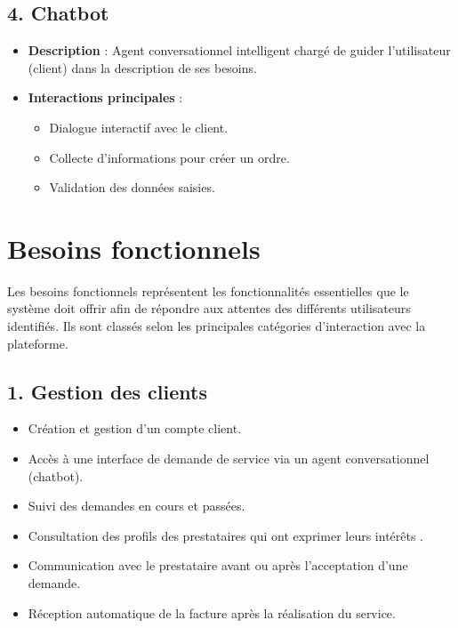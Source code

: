 \subsection*{4. Chatbot}
\begin{itemize}
  \item \textbf{Description} : Agent conversationnel intelligent chargé de guider l’utilisateur (client) dans la description de ses besoins.
  \item \textbf{Interactions principales} :
    \begin{itemize}
        \item Dialogue interactif avec le client.
        \item Collecte d’informations pour créer un ordre.
        \item Validation des données saisies.
    \end{itemize}
\end{itemize}
\section{Besoins fonctionnels}

Les besoins fonctionnels représentent les fonctionnalités essentielles que le système doit offrir afin de répondre aux attentes des différents utilisateurs identifiés. Ils sont classés selon les principales catégories d’interaction avec la plateforme.

\subsection*{1. Gestion des clients}
\begin{itemize}
    \item Création et gestion d’un compte client.
    \item Accès à une interface de demande de service via un agent conversationnel (chatbot).
    \item Suivi des demandes en cours et passées.
    \item Consultation des profils des prestataires qui ont exprimer leurs intérêts .
    \item Communication avec le prestataire avant ou après l’acceptation d’une demande.
    \item Réception automatique de la facture après la réalisation du service.
\end{itemize}

